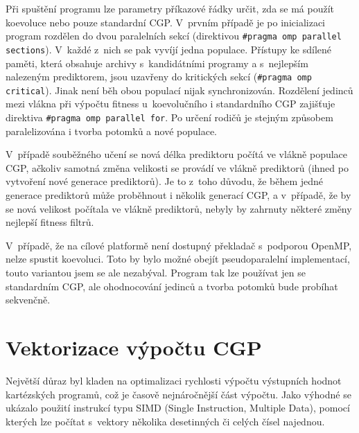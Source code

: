 Při spuštění programu lze parametry příkazové řádky určit, zda se má použít koevoluce nebo pouze standardní CGP. V~prvním případě je po inicializaci program rozdělen do dvou paralelních sekcí (direktivou \texttt{\#pragma omp parallel sections}). V~každé z~nich se pak vyvíjí jedna populace. Přístupy ke sdílené paměti, která obsahuje archivy s~kandidátními programy a s~nejlepším nalezeným prediktorem, jsou uzavřeny do kritických sekcí (\texttt{\#pragma omp critical}). Jinak není běh obou populací nijak synchronizován. Rozdělení jedinců mezi vlákna při výpočtu fitness u~koevolučního i standardního CGP zajišťuje direktiva \texttt{\#pragma omp parallel for}. Po určení rodičů je stejným způsobem paralelizována i tvorba potomků a nové populace.

V~případě souběžného učení se nová délka prediktoru počítá ve vlákně populace CGP, ačkoliv samotná změna velikosti se provádí ve vlákně prediktorů (ihned po vytvoření nové generace prediktorů). Je to z~toho důvodu, že během jedné generace prediktorů může proběhnout i několik generací CGP, a v~případě, že by se nová velikost počítala ve vlákně prediktorů, nebyly by zahrnuty některé změny nejlepší fitness filtrů.

V~případě, že na cílové platformě není dostupný překladač s~podporou OpenMP, nelze spustit koevoluci. Toto by bylo možné obejít pseudoparalelní implementací, touto variantou jsem se ale nezabýval. Program tak lze používat jen se standardním CGP, ale ohodnocování jedinců a tvorba potomků bude probíhat sekvenčně.


\section{Vektorizace výpočtu CGP}
\label{secImplVectorization}

Největší důraz byl kladen na optimalizaci rychlosti výpočtu výstupních hodnot kartézských programů, což je časově nejnáročnější část výpočtu. Jako výhodné se ukázalo použití  instrukcí typu SIMD (Single Instruction, Multiple Data), pomocí kterých lze počítat s~vektory několika desetinných či celých čísel najednou.


